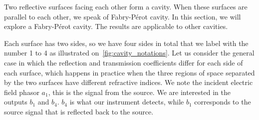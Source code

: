 Two reflective surfaces facing each other form a cavity.
When these surfaces are parallel to each other, we speak of Fabry-Pérot cavity.
In this section, we will explore a Fabry-Pérot cavity.
The results are applicable to other cavities.


Each surface has two sides, so we have four sides in total that we label with the number 1 to 4 as illustrated on~\cref{fig:cavity_notations}.
Let us consider the general case in which the reflection and transmission coefficients differ for each side of each surface,
which happens in practice when the three regions of space separated by the two surfaces have different refractive indices.
We note the incident electric field phasor $a_1$, this is the signal from the source.
We are interested in the outputs $b_1$ and $b_4$.
$b_4$ is what our instrument detects, while $b_1$ corresponds to the source signal that is reflected back to the source.

